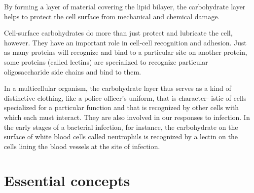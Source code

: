 By forming a layer of material covering the lipid bilayer, the carbohydrate
layer helps to protect the cell surface from mechanical and chemical
damage.

Cell-surface carbohydrates do more than just protect and lubricate the
cell, however. They have an important role in cell-cell recognition and
adhesion. Just as many proteins will recognize and bind to a particular
site on another protein, some proteins (called lectins) are specialized to
recognize particular oligosaccharide side chains and bind to them.

In a multicellular organism, the carbohydrate layer thus serves as a kind
of distinctive clothing, like a police officer’s uniform, that is character-
istic of cells specialized for a particular function and that is recognized
by other cells with which each must interact. They are also involved
in our responses to infection. In the early stages of a bacterial infection,
for instance, the carbohydrate on the surface of white blood cells called
neutrophils is recognized by a lectin on the cells lining the blood vessels 
at the site of infection.

\section{Essential concepts}

